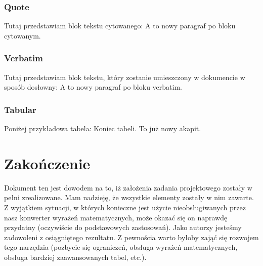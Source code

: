 \documentclass{article}
\begin{document}
    \subsubsection{Quote}
    Tutaj przedstawiam blok tekstu cytowanego:
    A to nowy paragraf po bloku cytowanym.

    \subsubsection{Verbatim}
    Tutaj przedstawiam blok tekstu, który zostanie umieszczony w dokumencie w sposób dosłowny:
    A to nowy paragraf po bloku verbatim.

    \subsubsection{Tabular}
    Poniżej przykładowa tabela: \newline
    \newline
    Koniec tabeli. To już nowy akapit.


    \section{Zakończenie}
    Dokument ten jest dowodem na to, iż założenia zadania projektowego zostały w pełni zrealizowane. Mam nadzieję, że wszystkie elementy zostały w nim zawarte. Z wyjątkiem sytuacji, w których konieczne jest użycie nieobsługiwanych przez nasz konwerter wyrażeń matematycznych, może okazać się on naprawdę przydatny (oczywiście do podstawowych zastosowań). Jako autorzy jesteśmy zadowoleni z osiągniętego rezultatu. Z pewnościa warto byłoby zająć się rozwojem tego narzędzia (pozbycie się ograniczeń, obsługa wyrażeń matematycznych, obsługa bardziej zaawansowanych tabel, etc.).
\end{document}
